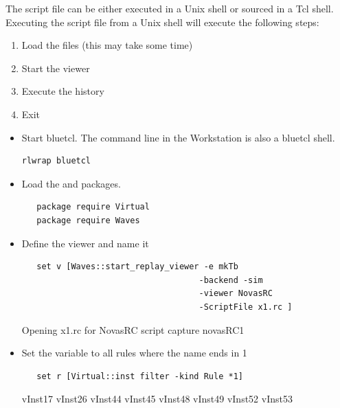 The script file can be either executed in a Unix shell or sourced in a
Tcl shell.   Executing the
script file from a Unix shell will execute the
following steps:
\begin{enumerate}
\item Load the  files (this may take some time)
\item Start the viewer
\item Execute the history
\item Exit
\end{enumerate}


\begin{itemize}

\item Start bluetcl.  The command line in the Workstation is also a
bluetcl shell.

\begin{verbatim}
rlwrap bluetcl
\end{verbatim}

\item Load the  and  packages.

\begin{verbatim}
   package require Virtual
   package require Waves
\end{verbatim}

\item Define the viewer and name it 

\begin{verbatim}
   set v [Waves::start_replay_viewer -e mkTb 
                                    -backend -sim 
                                    -viewer NovasRC 
                                    -ScriptFile x1.rc ]
\end{verbatim}

\begin{codebox}
Opening x1.rc for NovasRC script capture
novasRC1
\end{codebox}

\item Set the variable  to all rules where the name ends in 1

\begin{verbatim}
   set r [Virtual::inst filter -kind Rule *1]
\end{verbatim} 

\begin{codebox}
vInst17 vInst26 vInst44 vInst45 vInst48 vInst49 vInst52 vInst53
\end{codebox}


\end{itemize}

